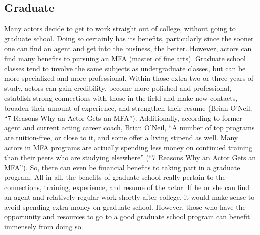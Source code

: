 \begin{multicols}{2}
	\subsection{Graduate}
		Many actors decide to get to work straight out of college, without going to graduate school. Doing so certainly has its benefits, particularly since the sooner one can find an agent and get into the business, the better. However, actors can find many benefits to pursuing an MFA (master of fine arts). Graduate school classes tend to involve the same subjects as undergraduate classes, but can be more specialized and more professional. Within those extra two or three years of study, actors can gain credibility, become more polished and professional, establish strong connections with those in the field and make new contacts, broaden their amount of experience, and strengthen their resume (Brian O’Neil, “7 Reasons Why an Actor Gets an MFA”). Additionally, according to former agent and current acting career coach, Brian O’Neil, “A number of top programs are tuition-free, or close to it, and some offer a living stipend as well. Many actors in MFA programs are actually spending less money on continued training than their peers who are studying elsewhere” (“7 Reasons Why an Actor Gets an MFA”). So, there can even be financial benefits to taking part in a graduate program. All in all, the benefits of graduate school really pertain to the connections, training, experience, and resume of the actor. If he or she can find an agent and relatively regular work shortly after college, it would make sense to avoid spending extra money on graduate school. However, those who have the opportunity and resources to go to a good graduate school program can benefit immensely from doing so. 


\end{multicols}
